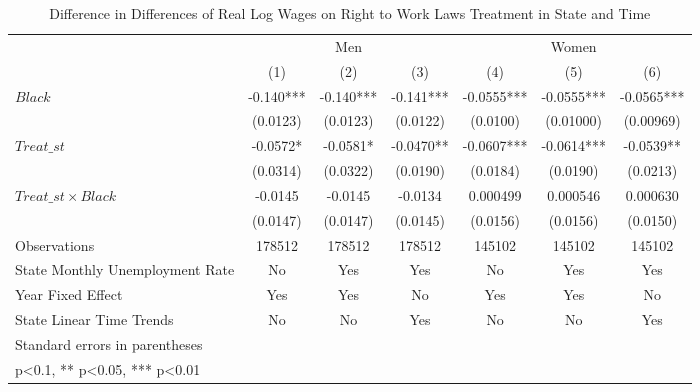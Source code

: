 \begin{table}[htbp]\centering
\def\sym#1{\ifmmode^{#1}\else\(^{#1}\)\fi}
\caption{Difference in Differences of Real Log Wages on Right to Work Laws Treatment in State and Time}
\begin{tabular}{l*{6}{c}}
\hline\hline
                    &\multicolumn{3}{c}{Men}                        &\multicolumn{3}{c}{Women}                      \\\cmidrule(lr){2-4}\cmidrule(lr){5-7}
                    &\multicolumn{1}{c}{(1)}   &\multicolumn{1}{c}{(2)}   &\multicolumn{1}{c}{(3)}   &\multicolumn{1}{c}{(4)}   &\multicolumn{1}{c}{(5)}   &\multicolumn{1}{c}{(6)}   \\
\hline
$ Black $           &      -0.140***&      -0.140***&      -0.141***&     -0.0555***&     -0.0555***&     -0.0565***\\
                    &    (0.0123)   &    (0.0123)   &    (0.0122)   &    (0.0100)   &   (0.01000)   &   (0.00969)   \\
[1em]
$ Treat\_{st} $      &     -0.0572*  &     -0.0581*  &     -0.0470** &     -0.0607***&     -0.0614***&     -0.0539** \\
                    &    (0.0314)   &    (0.0322)   &    (0.0190)   &    (0.0184)   &    (0.0190)   &    (0.0213)   \\
[1em]
$ Treat\_{st} \times Black $&     -0.0145   &     -0.0145   &     -0.0134   &    0.000499   &    0.000546   &    0.000630   \\
                    &    (0.0147)   &    (0.0147)   &    (0.0145)   &    (0.0156)   &    (0.0156)   &    (0.0150)   \\
\hline
Observations        &      178512   &      178512   &      178512   &      145102   &      145102   &      145102   \\
State Monthly Unemployment Rate&          No   &         Yes   &         Yes   &          No   &         Yes   &         Yes   \\
Year Fixed Effect   &         Yes   &         Yes   &          No   &         Yes   &         Yes   &          No   \\
State Linear Time Trends&          No   &          No   &         Yes   &          No   &          No   &         Yes   \\
\hline\hline
\multicolumn{7}{l}{\footnotesize Standard errors in parentheses}\\
\multicolumn{7}{l}{\footnotesize * p<0.1, ** p<0.05, *** p<0.01}\\
\end{tabular}
\end{table}
